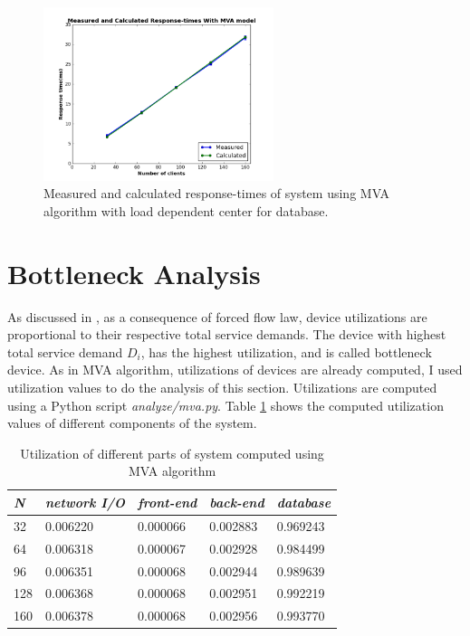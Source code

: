 \documentclass[11pt]{article}
\begin{document}
\begin{figure}[H]
  \includegraphics[width=0.6\textwidth,page=1]{figures/mva-load-dependent/response-time}
  \centering
  \caption{Measured and calculated response-times of system using MVA algorithm with load dependent center for  
  database.}
  \label{fig:mva-resp-2}
\end{figure}


\section {Bottleneck Analysis}

As discussed in \cite[section~33.6]{book}, as a consequence of forced flow law, device utilizations are 
proportional to their respective total service demands. The device with highest total
service demand $D_i$, has the highest utilization, and is called bottleneck device. As in MVA algorithm, 
utilizations of devices are already computed, I used utilization values to do the analysis of this section.
Utilizations are computed using a Python script \emph{analyze/mva.py}. Table \ref{tbl:utilization} shows the 
computed utilization values of different components of the system.

\begin{table}[!ht]
  \begin{tabular}{*5l}    \toprule
  \emph{N} & \emph{network I/O} &  \emph{front-end}  & \emph{back-end} & \emph{database}\\\midrule
32	&	0.006220	&0.000066	&0.002883&	0.969243 \\
64	&	0.006318	&0.000067	&0.002928&	0.984499 \\
96	&	0.006351	&0.000068	&0.002944&	0.989639 \\
128	&	0.006368	&0.000068	&0.002951&	0.992219 \\
160	&	0.006378	&0.000068	&0.002956&	0.993770 \\ 
\hline
  \end{tabular}
  \centering
  \caption{Utilization of different parts of system computed using MVA algorithm}
  \label{tbl:utilization}
\end{table}
\end{document}
